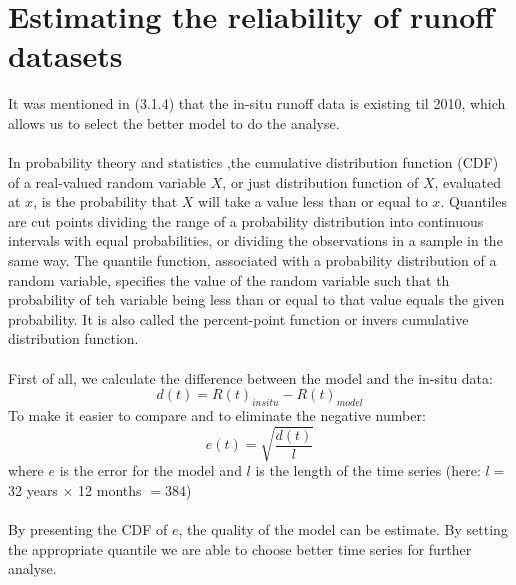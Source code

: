 \section{Estimating the reliability of runoff datasets}
It was mentioned in (3.1.4) that the in-situ runoff data is existing til 2010, which allows us to select the better model to do the analyse. \\\\
In probability theory and statistics ,the cumulative distribution function (CDF) of a real-valued random variable $X$, or just distribution function of $X$, evaluated at $x$, is the probability that $X$ will take a value less than or equal to $x$. Quantiles are cut points dividing the range of a probability distribution into continuous intervals with equal probabilities, or dividing the observations in a sample in the same way. The quantile function, associated with a probability distribution of a random variable, specifies the value of the random variable such that th probability of teh variable being less than or equal to that value equals the given probability. It is also called the percent-point function or invers cumulative distribution function. \\\\
First of all, we calculate the difference between the model and the in-situ data:
\begin{equation}
d(t) = R(t)_{insitu} - R(t)_{model}
\end{equation}
To make it easier to compare and to eliminate the negative number:
\begin{equation}
e(t) = \sqrt{\frac{d(t)}{l}}
\end{equation}
where $e$ is the error for the model and $l$ is the length of the time series (here: $l = $ 32 years $\times$ 12 months $= 384$)\\\\
By presenting the CDF of $e$, the quality of the model can be estimate. By setting the appropriate quantile we are able to choose better time series for further analyse. 
